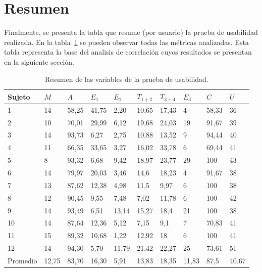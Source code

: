  
\section{Resumen}

Finalmente, se presenta la tabla que resume (por usuario) la prueba de usabilidad realizada. 
En la tabla~\ref{sec:tabla-resumen-prueba} se pueden observar todas las m\'etricas analizadas.
Esta tabla representa la base del analisis de correlaci\'on cuyos resultados se presentan
en la siguiente sección.

\begin{table}[H]
\centering
\footnotesize
\begin{tabular}{|p{1.4cm}|p{1.2cm}|p{1.2cm}|p{1.2cm}|p{1.2cm}|p{1.2cm}|p{1.2cm}|p{1.2cm}|p{1.2cm}|p{1.2cm}|}
\hline
Sujeto &  $M$  &   $A$  &   $E_1$ &  $E_2$  &  $T_{1+2}$  & $T_{3+4}$ & $E_3$ & $C$ & $U$ \\
\hline 
1  & 14 &  58,25 & 41,75 & 2,20  & 10,65 & 17,43 & 4  & 58,33 & 36 \\
2  & 10 &  70,01 & 29,99 & 6,12  & 19,68 & 24,03 & 19 & 91,67 & 39 \\
3  & 14 &  93,73 & 6,27  & 2,75  & 10,88 & 13,52 & 9  & 94,44 & 40 \\
4  & 11 &  66,35 & 33,65 & 3,27  & 16,02 & 33,78 & 6  & 69,44 & 41 \\
5  & 8  &  93,32 & 6,68  & 9,42  & 18,97 & 23,77 & 29 & 100   & 43 \\
6  & 14 &  79,97 & 20,03 & 3,46  & 14,6  & 18,23 & 4  & 91,67 & 38 \\
7  & 13 &  87,62 & 12,38 & 4,98  & 11,5  & 9,97  & 6  & 100   & 38 \\
8  & 12 &  90,45 & 9,55  & 7,48  & 7,02  & 11,78 & 6  & 100   & 42 \\
9  & 14 &  93,49 & 6,51  & 13,14 & 15,27 & 18,4  & 21 & 100   & 38 \\
10 & 14 & 87,64 & 12,36 & 5,12  & 7,15  & 9,1   & 7  & 70,83  & 41 \\
11 & 15 & 89,32 & 10,68 & 1,22  & 12,92 & 18      & 6  & 100  & 41 \\
12 & 14 & 94,30 & 5,70  & 11,79 & 21,42 & 22,27 & 25 & 73,61  & 51 \\
\hline 
Promedio & 12,75 & 83,70 & 16,30 & 5,91 & 13,83  & 18,35  & 11,83 & 87,5  & 40.67 \\
\hline
\end{tabular}
\caption{Resumen de las variables de la prueba de usabilidad.}
\label{sec:tabla-resumen-prueba}
\end{table}


